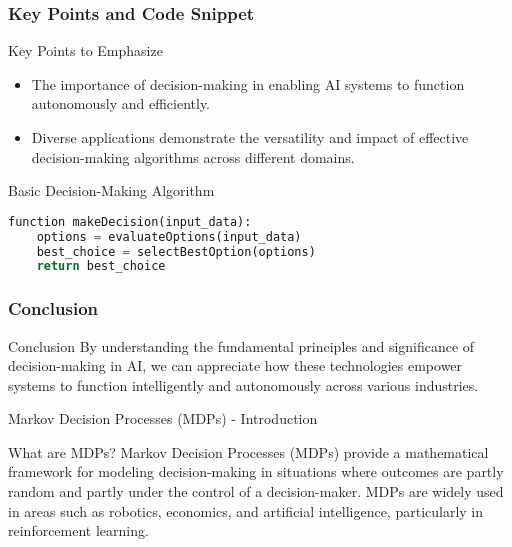\documentclass[aspectratio=169]{beamer}
\begin{document}
\begin{frame}[fragile]
    \frametitle{Key Points and Code Snippet}
    \begin{block}{Key Points to Emphasize}
        \begin{itemize}
            \item The importance of decision-making in enabling AI systems to function autonomously and efficiently.
            \item Diverse applications demonstrate the versatility and impact of effective decision-making algorithms across different domains.
        \end{itemize}
    \end{block}

    \begin{block}{Basic Decision-Making Algorithm}
        \begin{lstlisting}[language=Python]
function makeDecision(input_data):
    options = evaluateOptions(input_data)
    best_choice = selectBestOption(options)
    return best_choice
        \end{lstlisting}
    \end{block}
\end{frame}

\begin{frame}[fragile]
    \frametitle{Conclusion}
    \begin{block}{Conclusion}
        By understanding the fundamental principles and significance of decision-making in AI, we can appreciate how these technologies empower systems to function intelligently and autonomously across various industries.
    \end{block}
\end{frame}

\begin{frame}[fragile]{Markov Decision Processes (MDPs) - Introduction}
    \begin{block}{What are MDPs?}
        Markov Decision Processes (MDPs) provide a mathematical framework for modeling decision-making in situations where outcomes are partly random and partly under the control of a decision-maker. MDPs are widely used in areas such as robotics, economics, and artificial intelligence, particularly in reinforcement learning.
    \end{block}
\end{frame}
\end{document}

